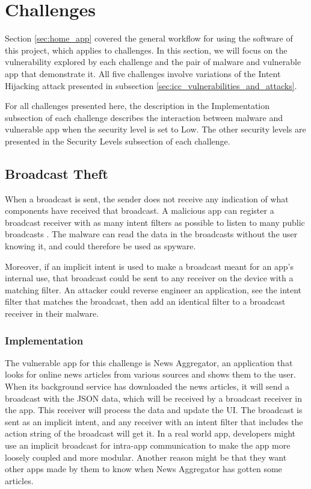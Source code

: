     \section{Challenges}
        \label{sec:challenges}
        
    Section \ref{sec:home_app} covered the general workflow for using the software of this project, which applies to challenges. In this section, we will focus on the vulnerability explored by each challenge and the pair of malware and vulnerable app that demonstrate it. All five challenges involve variations of the Intent Hijacking attack presented in subsection \ref{sec:icc_vulnerabilities_and_attacks}.
    
    For all challenges presented here, the description in the Implementation subsection of each challenge describes the interaction between malware and vulnerable app when the security level is set to Low. The other security levels are presented in the Security Levels subsection of each challenge.
    
    \subsection{Broadcast Theft}
        \label{subsec:broadcast_theft}
        
    When a broadcast is sent, the sender does not receive any indication of what components have received that broadcast. A malicious app can register a broadcast receiver with as many intent filters as possible to listen to many public broadcasts \cite{2010_icc_paper}. The malware can read the data in the broadcasts without the user knowing it, and could therefore be used as spyware. 
    
    Moreover, if an implicit intent is used to make a broadcast meant for an app’s internal use, that broadcast could be sent to any receiver on the device with a matching filter. An attacker could reverse engineer an application, see the intent filter that matches the broadcast, then add an identical filter to a broadcast receiver in their malware.
    
    \subsubsection{Implementation}
        \label{subsubsec:broadcast_theft_implementation}
        
    The vulnerable app for this challenge is News Aggregator, an application that looks for online news articles from various sources and shows them to the user. When its background service has downloaded the news articles, it will send a broadcast with the JSON data, which will be received by a broadcast receiver in the app. This receiver will process the data and update the UI. The broadcast is sent as an implicit intent, and any receiver with an intent filter that includes the action string of the broadcast will get it. In a real world app, developers might use an implicit broadcast for intra-app communication to make the app more loosely coupled and more modular. Another reason might be that they want other apps made by them to know when News Aggregator has gotten some articles.

